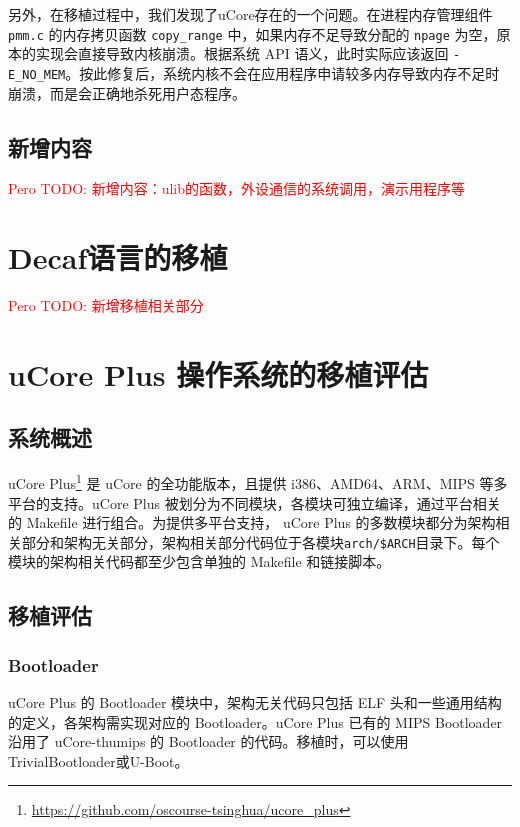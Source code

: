 另外，在移植过程中，我们发现了uCore存在的一个问题。在进程内存管理组件 \texttt{pmm.c} 的内存拷贝函数 \texttt{copy\_range} 中，如果内存不足导致分配的 \texttt{npage} 为空，原本的实现会直接导致内核崩溃。根据系统 API 语义，此时实际应该返回 \texttt{-E\_NO\_MEM}。按此修复后，系统内核不会在应用程序申请较多内存导致内存不足时崩溃，而是会正确地杀死用户态程序。

\subsection{新增内容}

\textcolor{red}{Pero TODO: 新增内容：ulib的函数，外设通信的系统调用，演示用程序等}


\section{Decaf语言的移植}

\textcolor{red}{Pero TODO: 新增移植相关部分}

\section{uCore Plus 操作系统的移植评估}

\subsection{系统概述}
uCore Plus\footnote{\url{https://github.com/oscourse-tsinghua/ucore_plus}} 是 uCore 的全功能版本，且提供 i386、AMD64、ARM、MIPS 等多平台的支持。uCore Plus 被划分为不同模块，各模块可独立编译，通过平台相关的 Makefile 进行组合。为提供多平台支持， uCore Plus 的多数模块都分为架构相关部分和架构无关部分，架构相关部分代码位于各模块\texttt{arch/\$ARCH}目录下。每个模块的架构相关代码都至少包含单独的 Makefile 和链接脚本。

\subsection{移植评估}

\subsubsection{Bootloader}
uCore Plus 的 Bootloader 模块中，架构无关代码只包括 ELF 头和一些通用结构的定义，各架构需实现对应的 Bootloader。uCore Plus 已有的 MIPS Bootloader 沿用了 uCore-thumips 的 Bootloader 的代码。移植时，可以使用TrivialBootloader或U-Boot。

